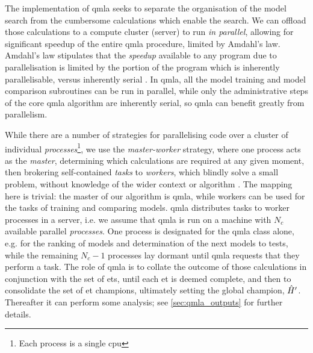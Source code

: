 The implementation of \gls{qmla} seeks to separate the organisation of the  \gls{model search}  from the 
    cumbersome calculations which enable the search. 
We can offload those calculations to a compute cluster (server) to run \emph{in parallel},
    allowing for significant speedup of the entire \gls{qmla} procedure, 
    limited by Amdahl's law. 
Amdahl's law stipulates that the \emph{speedup} available to any program due to parallelisation 
    is limited by the portion of the program which is inherently parallelisable, versus inherently serial \cite{hill2008amdahl}.
In \gls{qmla}, all the model training and model comparison subroutines can be run in parallel, 
    while only the administrative steps of the core \gls{qmla} algorithm are inherently serial, 
    so \gls{qmla} can benefit greatly from parallelism.
\par

While there are a number of strategies for parallelising code over a cluster of individual \emph{processes}\footnote{Each process is a single \acrshort{cpu}}, 
    we use the \emph{master-worker} strategy, where one process acts as the \emph{master}, 
    determining which calculations are required at any given moment, 
    then brokering self-contained \emph{tasks} to \emph{workers}, 
    which blindly solve a small problem, without knowledge of the wider context or algorithm \cite{hockney2019parallel}.
The mapping here is trivial: the master of our algorithm is \gls{qmla}, 
    while workers can be used for the tasks of training and comparing models. 
\gls{qmla} distributes tasks to worker processes in a server, 
    i.e. we assume that \gls{qmla} is run on a machine with $N_c$ available parallel \emph{processes}\footnotemark. 
One process is designated for the \gls{qmla} class alone,
    e.g. for the ranking of models and determination of the next models to tests, 
    while the remaining $N_c - 1$ processes lay dormant until \gls{qmla} requests that they perform a task. 
The role of \gls{qmla} is to collate the outcome of those calculations in conjunction with the set of \glspl{et}, 
    until each \gls{et} is deemed complete, and then to consolidate the set of 
    \gls{et} champions, ultimately setting the global champion, $\hat{H}^{\prime}$. 
Thereafter it can perform some analysis; see \cref{sec:qmla_outputs} for further details. 

